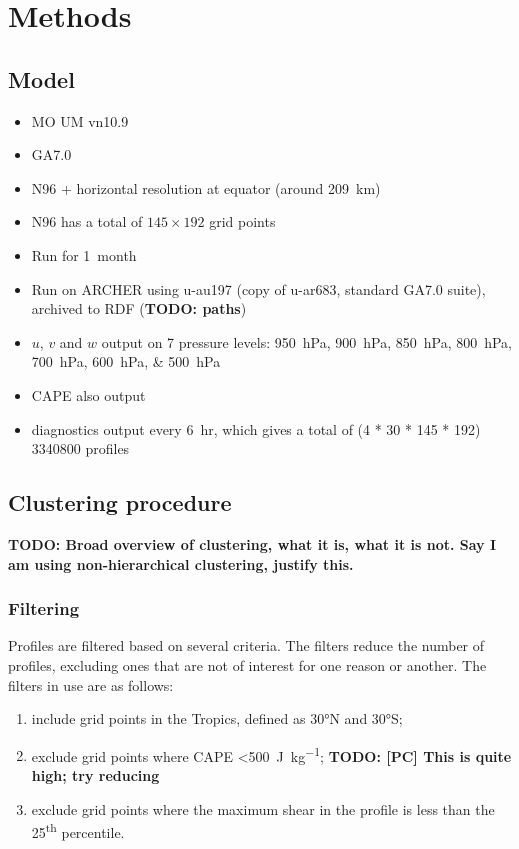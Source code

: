 \documentclass{article}
\newcommand\todo[1]{\textbf{TODO: #1}}
\begin{document}
\section{Methods}

\subsection{Model}

\begin{itemize}
    \item MO UM vn10.9
    \item GA7.0
    \item N96 + horizontal resolution at equator (around \SI{209}{km})
    \item N96 has a total of $145 \times 192$ grid points
    \item Run for \SI{1}{month}
    \item Run on ARCHER using u-au197 (copy of u-ar683, standard GA7.0 suite), archived to RDF (\todo{paths})
    \item $u$, $v$ and $w$ output on 7 pressure levels: \SIlist{950;900;850;800;700;600;500}{hPa}
    \item CAPE also output
    \item diagnostics output every \SI{6}{hr}, which gives a total of (4 * 30 * 145 * 192) \si{3340800} profiles
\end{itemize}

\subsection{Clustering procedure}

\todo{Broad overview of clustering, what it is, what it is not. Say I am using non-hierarchical clustering, justify this.}

\subsubsection{Filtering}

Profiles are filtered based on several criteria. The filters reduce the number of profiles, excluding ones that are not of interest for one reason or another. The filters in use are as follows:

\begin{enumerate}
    \item include grid points in the Tropics, defined as \ang{30}N and \ang{30}S;
    \item exclude grid points where CAPE \textless \SI{500}{J.kg^{-1}}; \todo{[PC] This is quite high; try reducing}
    \item exclude grid points where the maximum shear in the profile is less than the 25\textsuperscript{th} percentile.
\end{enumerate} 
\end{document}
